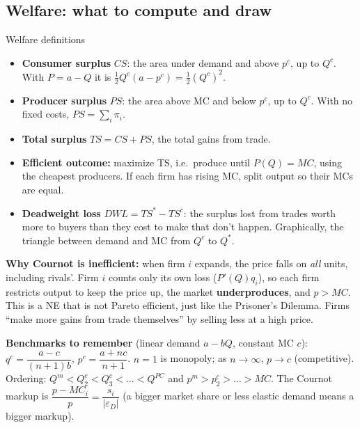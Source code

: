 \documentclass[11pt]{article}
\begin{document}
\subsection{Welfare: what to compute and draw}
\begin{defbox}{Welfare definitions}
\begin{itemize}
\item \textbf{Consumer surplus} $CS$: the area under demand and above $p^c$, up to $Q^c$. With $P=a-Q$ it is $\tfrac12Q^c(a-p^c)=\tfrac12(Q^c)^2$.
\item \textbf{Producer surplus} $PS$: the area above MC and below $p^c$, up to $Q^c$. With no fixed costs, $PS=\sum_i\pi_i$.
\item \textbf{Total surplus} $TS=CS+PS$, the total gains from trade.
\item \textbf{Efficient outcome:} maximize TS, i.e.\ produce until $P(Q)=MC$, using the cheapest producers. If each firm has rising MC, split output so their MCs are equal.
\item \textbf{Deadweight loss} $DWL=TS^*-TS^c$: the surplus lost from trades worth more to buyers than they cost to make that don't happen. Graphically, the triangle between demand and MC from $Q^c$ to $Q^*$.
\end{itemize}
\end{defbox}

\textbf{Why Cournot is inefficient:} when firm $i$ expands, the price falls on \emph{all} units, including rivals'. Firm $i$ counts only its own loss ($P'(Q)q_i$), so each firm restricts output to keep the price up, the market \textbf{underproduces}, and $p>MC$. This is a NE that is not Pareto efficient, just like the Prisoner's Dilemma. Firms ``make more gains from trade themselves'' by selling less at a high price.

\textbf{Benchmarks to remember} (linear demand $a-bQ$, constant MC $c$): $q^c=\dfrac{a-c}{(n+1)b}$, $p^c=\dfrac{a+nc}{n+1}$. $n=1$ is monopoly; as $n\to\infty$, $p\to c$ (competitive). Ordering: $Q^m<Q^c_2<Q^c_3<\dots<Q^{PC}$ and $p^m>p^c_2>\dots>MC$. The Cournot markup is $\dfrac{p-MC_i}{p}=\dfrac{s_i}{|\varepsilon_D|}$ (a bigger market share or less elastic demand means a bigger markup).
\end{document}
